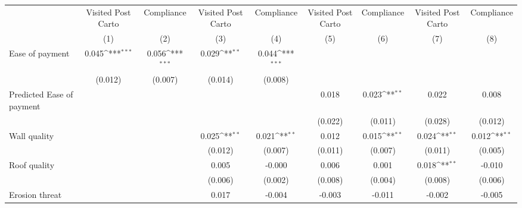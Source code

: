 {
\def\sym#1{\ifmmode^{#1}\else\(^{#1}\)\fi}
\begin{tabular}{l*{8}{c}}
\toprule
                &\multicolumn{1}{c}{Visited Post Carto}&\multicolumn{1}{c}{Compliance}&\multicolumn{1}{c}{Visited Post Carto}&\multicolumn{1}{c}{Compliance}&\multicolumn{1}{c}{Visited Post Carto}&\multicolumn{1}{c}{Compliance}&\multicolumn{1}{c}{Visited Post Carto}&\multicolumn{1}{c}{Compliance}\\
                &\multicolumn{1}{c}{(1)}         &\multicolumn{1}{c}{(2)}         &\multicolumn{1}{c}{(3)}         &\multicolumn{1}{c}{(4)}         &\multicolumn{1}{c}{(5)}         &\multicolumn{1}{c}{(6)}         &\multicolumn{1}{c}{(7)}         &\multicolumn{1}{c}{(8)}         \\
\midrule
Ease of payment &    0.045\sym{***}&    0.056\sym{***}&    0.029\sym{**} &    0.044\sym{***}&                  &                  &                  &                  \\
                &  (0.012)         &  (0.007)         &  (0.014)         &  (0.008)         &                  &                  &                  &                  \\
Predicted Ease of payment&                  &                  &                  &                  &    0.018         &    0.023\sym{**} &    0.022         &    0.008         \\
                &                  &                  &                  &                  &  (0.022)         &  (0.011)         &  (0.028)         &  (0.012)         \\
Wall quality    &                  &                  &    0.025\sym{**} &    0.021\sym{**} &    0.012         &    0.015\sym{**} &    0.024\sym{**} &    0.012\sym{**} \\
                &                  &                  &  (0.012)         &  (0.007)         &  (0.011)         &  (0.007)         &  (0.011)         &  (0.005)         \\
Roof quality    &                  &                  &    0.005         &   -0.000         &    0.006         &    0.001         &    0.018\sym{**} &   -0.010         \\
                &                  &                  &  (0.006)         &  (0.002)         &  (0.008)         &  (0.004)         &  (0.008)         &  (0.006)         \\
Erosion threat  &                  &                  &    0.017         &   -0.004         &   -0.003         &   -0.011         &   -0.002         &   -0.005         \\

\end{tabular}}
